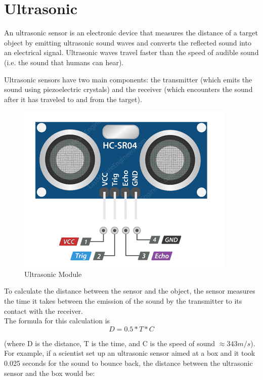 \section{Ultrasonic}
    \label{ap:b.us}
An ultrasonic sensor is an electronic device that measures the distance of a target object by emitting ultrasonic sound waves and converts the reflected sound into an electrical signal. Ultrasonic waves travel faster than the speed of audible sound (i.e. the sound that humans can hear). 

Ultrasonic sensors have two main components: the transmitter (which emits the sound using piezoelectric crystals) and the receiver (which encounters the sound after it has traveled to and from the target).

\begin{figure}[h!]
     \centering
         \centering
         \includegraphics[scale=0.5]{./Figures/AppendixB/ulta2.png}
         \caption{Ultrasonic Module}
         \label{fig: Ultrasonic Module}
         
\end{figure}
To calculate the distance between the sensor and the object, the sensor measures the time it takes between the emission of the sound by the transmitter to its contact with the receiver. \\

The formula for this calculation is 
\[D = 0.5* T * C\] 

(where D is the distance, T is the time, and C is the speed of sound $\approx 343 m/s$). \\

For example, if a scientist set up an ultrasonic sensor aimed at a box and it took 0.025 seconds for the sound to bounce back, the distance between the ultrasonic sensor and the box would be:

